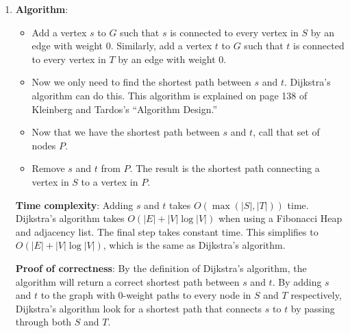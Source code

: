 \documentclass[a4paper, 10pt]{article}
\begin{document}
\begin{enumerate}
	\item \textbf{Algorithm}:
		\begin{itemize}
			\item Add a vertex $s$ to $G$ such that $s$ is connected to every
				vertex in $S$ by an edge with weight 0. Similarly, add a vertex
				$t$ to $G$ such that $t$ is connected to every vertex in $T$ by
				an edge with weight 0.
			\item Now we only need to find the shortest path between $s$ and
				$t$. Dijkstra's algorithm can do this. This algorithm is
				explained on page 138 of Kleinberg and Tardos's ``Algorithm
				Design.''
			\item Now that we have the shortest path between $s$ and $t$, call
				that set of nodes $P$.
			\item Remove $s$ and $t$ from $P$. The result is the shortest path
				connecting a vertex in $S$ to a vertex in $P$.
		\end{itemize}

		\textbf{Time complexity}: Adding $s$ and $t$ takes $O(\max (|S|, |T|))$
		time. Dijkstra's algorithm takes $O(|E| + |V| \log |V|)$ when using a
		Fibonacci Heap and adjacency list. The final step takes constant time.
		This simplifies to $O(|E| + |V| \log |V|)$, which is the same as
		Dijkstra's algorithm.

		\textbf{Proof of correctness}: By the definition of Dijkstra's
		algorithm, the algorithm will return a correct shortest path between $s$
		and $t$. By adding $s$ and $t$ to the graph with 0-weight paths to every
		node in $S$ and $T$ respectively, Dijkstra's algorithm look for a
		shortest path that connects $s$ to $t$ by passing through both $S$ and
		$T$.
\end{enumerate}
\end{document}
